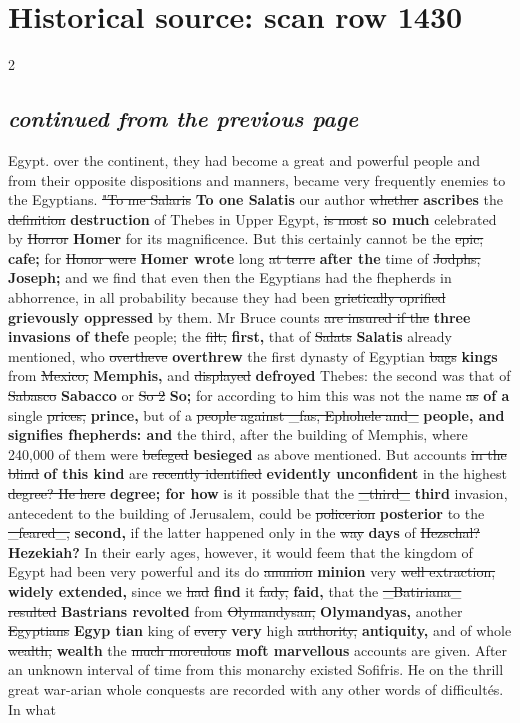 \documentclass[10pt]{article}
\begin{document}
\section*{Historical source: scan row 1430}
\begin{multicols}{2}
\subsection*{\textit{continued from the previous page}}
Egypt. over the continent, they had become a great and powerful people and from their opposite dispositions and manners, became very frequently enemies to the Egyptians. \sout{"To me Salaris} \textbf{To one Salatis} our author \sout{whether} \textbf{ascribes} the \sout{definition} \textbf{destruction} of Thebes in Upper Egypt, \sout{is most} \textbf{so much} celebrated by \sout{Horror} \textbf{Homer} for its magnificence. But this certainly cannot be the \sout{epic;} \textbf{cafe;} for \sout{Honor were} \textbf{Homer wrote} long \sout{at terre} \textbf{after the} time of \sout{Jodphs,} \textbf{Joseph;} and we find that even then the Egyptians had the fhepherds in abhorrence, in all probability because they had been \sout{grietically oprified} \textbf{grievously oppressed} by them. Mr Bruce counts \sout{are insured if the} \textbf{three invasions of thefe} people; the \sout{filt,} \textbf{first,} that of \sout{Salats} \textbf{Salatis} already mentioned, who \sout{overtheve} \textbf{overthrew} the first dynasty of Egyptian \sout{bags} \textbf{kings} from \sout{Mexico,} \textbf{Memphis,} and \sout{displayed} \textbf{defroyed} Thebes: the second was that of \sout{Sabasco} \textbf{Sabacco} or \sout{So 2} \textbf{So;} for according to him this was not the name \sout{as} \textbf{of a} single \sout{prices,} \textbf{prince,} but of a \sout{people against \_fas, Ephohele and\_} \textbf{people, and signifies fhepherds: and} the third, after the building of Memphis, where 240,000 of them were \sout{befeged} \textbf{besieged} as above mentioned. But accounts \sout{in the blind} \textbf{of this kind} are \sout{recently identified} \textbf{evidently unconfident} in the highest \sout{degree? He here} \textbf{degree; for how} is it possible that the \sout{\_third\_} \textbf{third} invasion, antecedent to the building of Jerusalem, could be \sout{policerion} \textbf{posterior} to the \sout{\_feared\_,} \textbf{second,} if the latter happened only in the \sout{way} \textbf{days} of \sout{Hezschal?} \textbf{Hezekiah?} In their early ages, however, it would feem that the kingdom of Egypt had been very powerful and its do \sout{anunion} \textbf{minion} very \sout{well extraction,} \textbf{widely extended,} since we \sout{had} \textbf{find} it \sout{fady,} \textbf{faid,} that the \sout{\_Batiriana\_ resulted} \textbf{Bastrians revolted} from \sout{Olymandysan,} \textbf{Olymandyas,} another \sout{Egyptians} \textbf{Egyp tian} king of \sout{every} \textbf{very} high \sout{authority,} \textbf{antiquity,} and of whole \sout{wealth,} \textbf{wealth} the \sout{much moreulous} \textbf{moft marvellous} accounts are given. After an unknown interval of time from this monarchy existed Sofifris. He on the thrill great war-arian whole conquests are recorded with any other words of difficultés. In what 
\end{multicols}
\end{document}
